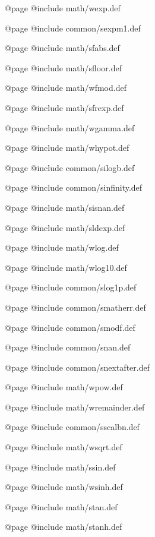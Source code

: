 @page
@include math/wexp.def

@page
@include common/sexpm1.def

@page
@include math/sfabs.def

@page
@include math/sfloor.def

@page
@include math/wfmod.def

@page
@include math/sfrexp.def

@page
@include math/wgamma.def

@page
@include math/whypot.def

@page
@include common/silogb.def

@page
@include common/sinfinity.def

@page
@include math/sisnan.def

@page
@include math/sldexp.def

@page
@include math/wlog.def

@page
@include math/wlog10.def

@page
@include common/slog1p.def

@page
@include common/smatherr.def

@page
@include common/smodf.def

@page
@include common/snan.def

@page
@include common/snextafter.def

@page
@include math/wpow.def

@page
@include math/wremainder.def

@page
@include common/sscalbn.def

@page
@include math/wsqrt.def

@page
@include math/ssin.def

@page
@include math/wsinh.def

@page
@include math/stan.def

@page
@include math/stanh.def
